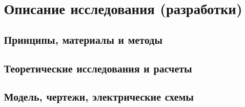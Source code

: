 \chapter{Описание исследования (разработки)}
\section{Принципы, материалы и методы}
\section{Теоретические исследования и расчеты}
\section{Модель, чертежи, электрические схемы}